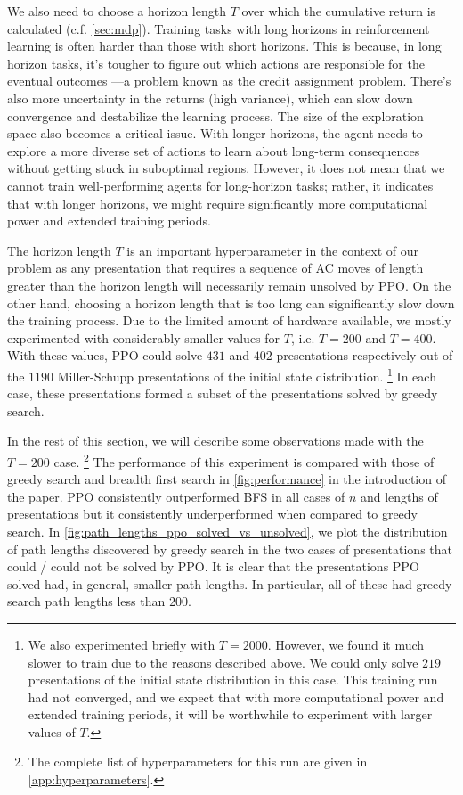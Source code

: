 We also need to choose a horizon length $T$ over which the cumulative return is calculated (c.f. \autoref{sec:mdp}). Training tasks with long horizons in reinforcement learning is often harder than those with short horizons. This is because, in long horizon tasks, it's tougher to figure out which actions are responsible for the eventual outcomes —a problem known as the credit assignment problem. There's also more uncertainty in the returns (high variance), which can slow down convergence and destabilize the learning process. The size of the exploration space also becomes a critical issue. With longer horizons, the agent needs to explore a more diverse set of actions to learn about long-term consequences without getting stuck in suboptimal regions. However, it does not mean that we cannot train well-performing agents for long-horizon tasks; rather, it indicates that with longer horizons, we might require significantly more computational power and extended training periods.
\newline

The horizon length $T$ is an important hyperparameter in the context of our problem as any presentation that requires a sequence of AC moves of length greater than the horizon length will necessarily remain unsolved by PPO. On the other hand, choosing a horizon length that is too long can significantly slow down the training process. Due to the limited amount of hardware available, we mostly experimented with considerably smaller values for $T$, i.e. $T=200$ and $T=400$.  With these values, PPO could solve $431$ and $402$ presentations respectively out of the $1190$ Miller-Schupp presentations of the initial state distribution.
\footnote{
We also experimented briefly with $T=2000$. However, we found it much slower to train due to the reasons described above. We could only solve $219$ presentations of the initial state distribution in this case. This training run had not converged, and we expect that with more computational power and extended training periods, it will be worthwhile to experiment with larger values of $T$.
}
In each case, these presentations formed a subset of the presentations solved by greedy search.  
\newline 

In the rest of this section, we will describe some observations made with the $T=200$ case.
\footnote{
The complete list of hyperparameters for this run are given in \autoref{app:hyperparameters}. 
} The performance of this experiment is compared with those of greedy search and breadth first search in \autoref{fig:performance} in the introduction of the paper. PPO consistently outperformed BFS in all cases of $n$ and lengths of presentations but it consistently underperformed when compared to greedy search. In \autoref{fig:path_lengths_ppo_solved_vs_unsolved}, we plot the distribution of path lengths discovered by greedy search in the two cases of presentations that could / could not be solved by PPO. It is clear that the presentations PPO solved had, in general, smaller path lengths. In particular, all of these had greedy search path lengths less than $200$. 
\newline 

